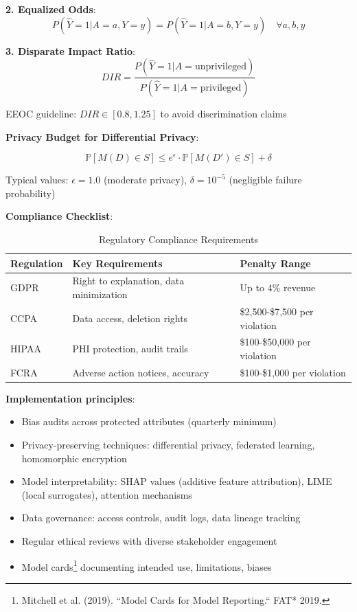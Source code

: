 \textbf{2. Equalized Odds}:
\begin{equation}
P(\hat{Y} = 1 | A = a, Y = y) = P(\hat{Y} = 1 | A = b, Y = y) \quad \forall a, b, y
\end{equation}

\textbf{3. Disparate Impact Ratio}:
\begin{equation}
DIR = \frac{P(\hat{Y} = 1 | A = \text{unprivileged})}{P(\hat{Y} = 1 | A = \text{privileged})}
\end{equation}

EEOC guideline: $DIR \in [0.8, 1.25]$ to avoid discrimination claims

\textbf{Privacy Budget for Differential Privacy}:

\begin{equation}
\mathbb{P}[M(D) \in S] \leq e^\epsilon \cdot \mathbb{P}[M(D') \in S] + \delta
\end{equation}

Typical values: $\epsilon = 1.0$ (moderate privacy), $\delta = 10^{-5}$ (negligible failure probability)

\textbf{Compliance Checklist}:

\begin{table}[h]
\centering
\caption{Regulatory Compliance Requirements}
\begin{tabular}{lll}
\toprule
\textbf{Regulation} & \textbf{Key Requirements} & \textbf{Penalty Range} \\
\midrule
GDPR & Right to explanation, data minimization & Up to 4\% revenue \\
CCPA & Data access, deletion rights & \$2,500-\$7,500 per violation \\
HIPAA & PHI protection, audit trails & \$100-\$50,000 per violation \\
FCRA & Adverse action notices, accuracy & \$100-\$1,000 per violation \\
\bottomrule
\end{tabular}
\end{table}

\textbf{Implementation principles}:
\begin{itemize}
    \item Bias audits across protected attributes (quarterly minimum)
    \item Privacy-preserving techniques: differential privacy, federated learning, homomorphic encryption
    \item Model interpretability: SHAP values (additive feature attribution), LIME (local surrogates), attention mechanisms
    \item Data governance: access controls, audit logs, data lineage tracking
    \item Regular ethical reviews with diverse stakeholder engagement
    \item Model cards\footnote{Mitchell et al. (2019). ``Model Cards for Model Reporting.`` FAT* 2019.} documenting intended use, limitations, biases
\end{itemize}

